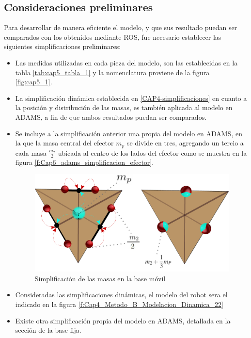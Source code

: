     \subsection{ Consideraciones preliminares}
    
    Para desarrollar de manera eficiente el modelo, y que sus resultado puedan ser comparados con los obtenidos mediante ROS, fue necesario establecer las siguientes simplificaciones preliminares:
    
    \begin{itemize}
        \item Las medidas utilizadas en cada pieza del modelo, son las establecidas en la tabla \eqref{tab:cap5_tabla_1} y la nomenclatura proviene de la figura \eqref{fig:cap5_1}.
        \item La simplificación dinámica establecida en \eqref{CAP4-simplificaciones} en cuanto a la posición y distribución de las masas, es también aplicada al modelo en ADAMS, a fin de que ambos resultados puedan ser comparados.
        \item Se incluye a la simplificación anterior una propia del modelo en ADAMS, en la que la masa central del efector $m_{p}$ se divide en tres, agregando un tercio a cada masa $\frac{m_{2}}{2}$ ubicada al centro de los lados del efector como se muestra en la figura \eqref{f:Cap6_adams_simplificacion_efector}.
            \begin{figure}[h]
                \centering
                \includegraphics[width=0.8\linewidth]{Main/Chapter6/Images6/adams/simplificacion-masas.pdf}
                \caption{Simplificación de las masas en la base móvil}
                \label{f:Cap6_adams_simplificacion_efector}
            \end{figure}
        \item Consideradas las simplificaciones dinámicas, el modelo del robot sera el indicado en la figura \eqref{f:Cap4_Metodo_B_Modelacion_Dinamica_22}
        \item Existe otra simplificación propia del modelo en ADAMS, detallada en la sección de la base fija.
    \end{itemize}
    

